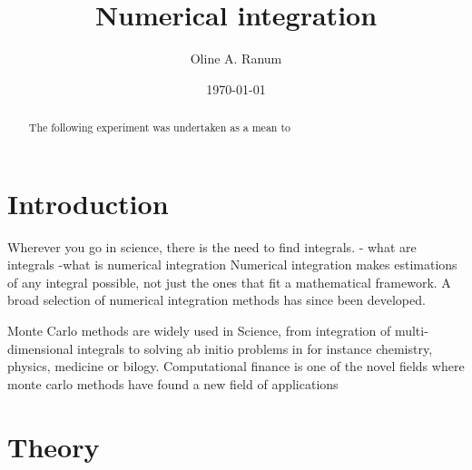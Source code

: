 \documentclass[%
reprint,
amsmath,amssymb,
aps,
]{revtex4-1}
\begin{document}
\title{Numerical integration}
\author{Oline A. Ranum}
\date{\today}


\begin{abstract}
	The following experiment was undertaken as a mean to 
\end{abstract}
\maketitle

\section{Introduction}
Wherever you go in science, there is the need to find integrals.
- what are integrals 
-what is numerical integration 
Numerical integration makes estimations  of any integral possible, not just the ones that fit a mathematical framework. 
A broad selection of numerical integration methods has since been developed. 

Monte Carlo methods are widely used in Science, from integration of multi-dimensional integrals to solving ab initio problems in for instance chemistry, physics, medicine or bilogy. Computational finance is one of the novel fields where monte carlo methods have found a new field of applications

\section{Theory}
\end{document}
